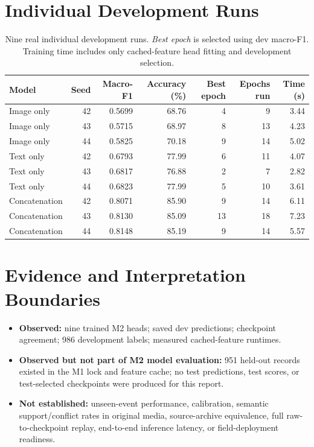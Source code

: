 \documentclass[11pt,a4paper]{article}
\begin{document}
\section{Individual Development Runs}
\begin{table}[htbp]
\centering\small
\caption{Nine real individual development runs. \emph{Best epoch} is selected using dev macro-F1. Training time includes only cached-feature head fitting and development selection.}
\label{tab:individual}
\begin{tabularx}{\linewidth}{@{}lrrrrrr@{}}
\toprule
Model & Seed & Macro-F1 & Accuracy (\%) & Best epoch & Epochs run & Time (s) \\
\midrule
Image only & 42 & 0.5699 & 68.76 & 4 & 9 & 3.44 \\
Image only & 43 & 0.5715 & 68.97 & 8 & 13 & 4.23 \\
Image only & 44 & 0.5825 & 70.18 & 9 & 14 & 5.02 \\
Text only & 42 & 0.6793 & 77.99 & 6 & 11 & 4.07 \\
Text only & 43 & 0.6817 & 76.88 & 2 & 7 & 2.82 \\
Text only & 44 & 0.6823 & 77.99 & 5 & 10 & 3.61 \\
Concatenation & 42 & 0.8071 & 85.90 & 9 & 14 & 6.11 \\
Concatenation & 43 & 0.8130 & 85.09 & 13 & 18 & 7.23 \\
Concatenation & 44 & 0.8148 & 85.19 & 9 & 14 & 5.57 \\
\bottomrule
\end{tabularx}
\end{table}

\section{Evidence and Interpretation Boundaries}
\begin{itemize}
\item \textbf{Observed:} nine trained M2 heads; saved dev predictions; checkpoint agreement; 986 development labels; measured cached-feature runtimes.
\item \textbf{Observed but not part of M2 model evaluation:} 951 held-out records existed in the M1 lock and feature cache; no test predictions, test scores, or test-selected checkpoints were produced for this report.
\item \textbf{Not established:} unseen-event performance, calibration, semantic support/conflict rates in original media, source-archive equivalence, full raw-to-checkpoint replay, end-to-end inference latency, or field-deployment readiness.
\end{itemize}
\end{document}

